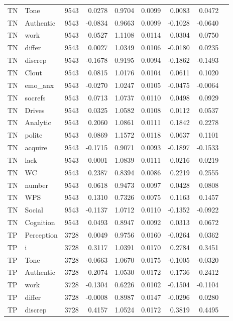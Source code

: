 \begin{longtable}{@{}llrrrrrrr@{}}
TN & Tone & 9543 & 0.0278 & 0.9704 & 0.0099 & 0.0083 & 0.0472 \\
TN & Authentic & 9543 & -0.0834 & 0.9663 & 0.0099 & -0.1028 & -0.0640 \\
TN & work & 9543 & 0.0527 & 1.1108 & 0.0114 & 0.0304 & 0.0750 \\
TN & differ & 9543 & 0.0027 & 1.0349 & 0.0106 & -0.0180 & 0.0235 \\
TN & discrep & 9543 & -0.1678 & 0.9195 & 0.0094 & -0.1862 & -0.1493 \\
TN & Clout & 9543 & 0.0815 & 1.0176 & 0.0104 & 0.0611 & 0.1020 \\
TN & emo\_anx & 9543 & -0.0270 & 1.0247 & 0.0105 & -0.0475 & -0.0064 \\
TN & socrefs & 9543 & 0.0713 & 1.0737 & 0.0110 & 0.0498 & 0.0929 \\
TN & Drives & 9543 & 0.0325 & 1.0582 & 0.0108 & 0.0112 & 0.0537 \\
TN & Analytic & 9543 & 0.2060 & 1.0861 & 0.0111 & 0.1842 & 0.2278 \\
TN & polite & 9543 & 0.0869 & 1.1572 & 0.0118 & 0.0637 & 0.1101 \\
TN & acquire & 9543 & -0.1715 & 0.9071 & 0.0093 & -0.1897 & -0.1533 \\
TN & lack & 9543 & 0.0001 & 1.0839 & 0.0111 & -0.0216 & 0.0219 \\
TN & WC & 9543 & 0.2387 & 0.8394 & 0.0086 & 0.2219 & 0.2555 \\
TN & number & 9543 & 0.0618 & 0.9473 & 0.0097 & 0.0428 & 0.0808 \\
TN & WPS & 9543 & 0.1310 & 0.7326 & 0.0075 & 0.1163 & 0.1457 \\
TN & Social & 9543 & -0.1137 & 1.0712 & 0.0110 & -0.1352 & -0.0922 \\
TN & Cognition & 9543 & 0.0493 & 0.8947 & 0.0092 & 0.0313 & 0.0672 \\
TP & Perception & 3728 & 0.0049 & 0.9756 & 0.0160 & -0.0264 & 0.0362 \\
TP & i & 3728 & 0.3117 & 1.0391 & 0.0170 & 0.2784 & 0.3451 \\
TP & Tone & 3728 & -0.0663 & 1.0670 & 0.0175 & -0.1005 & -0.0320 \\
TP & Authentic & 3728 & 0.2074 & 1.0530 & 0.0172 & 0.1736 & 0.2412 \\
TP & work & 3728 & -0.1304 & 0.6226 & 0.0102 & -0.1504 & -0.1104 \\
TP & differ & 3728 & -0.0008 & 0.8987 & 0.0147 & -0.0296 & 0.0280 \\
TP & discrep & 3728 & 0.4157 & 1.0524 & 0.0172 & 0.3819 & 0.4495 \\

\end{longtable}
